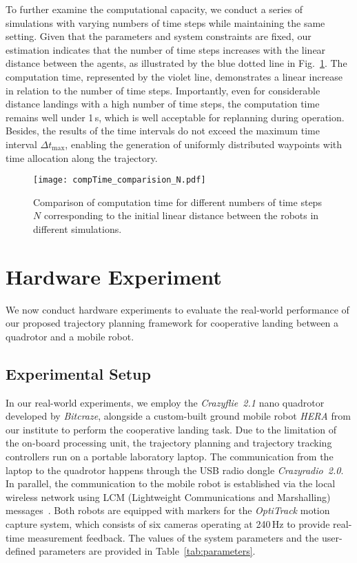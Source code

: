 \documentclass[conference,preprint]{IEEEtran}
\begin{document}
To further examine the computational capacity, we conduct a series of simulations with varying numbers of time steps while maintaining the same setting. Given that the parameters and system constraints are fixed, our estimation indicates that the number of time steps increases with the linear distance between the agents, as illustrated by the blue dotted line in Fig.~\ref{fig:compTime_comparision_N}. The computation time, represented by the violet line, demonstrates a linear increase in relation to the number of time steps. Importantly, even for considerable distance landings with a high number of time steps, the computation time remains well under 1\,s, which is well acceptable for replanning during operation. Besides, the results of the time intervals do not exceed the maximum time interval $\Delta t_\text{max}$, enabling the generation of uniformly distributed waypoints with time allocation along the trajectory.

\begin{figure}[thpb]
  \centering
  \texttt{[image: compTime\_comparision\_N.pdf]}
  \caption{Comparison of computation time for different numbers of time steps $N$ corresponding to the initial linear distance between the robots in different simulations.} 
  \label{fig:compTime_comparision_N}
\end{figure}    

\section{Hardware Experiment}
\label{sec:hardware_experiment}

We now conduct hardware experiments to evaluate the real-world performance of our proposed trajectory planning framework for cooperative landing between a quadrotor and a mobile robot.

\subsection{Experimental Setup}
In our real-world experiments, we employ the \textit{Crazyflie~2.1} nano quadrotor developed by \textit{Bitcraze}, alongside a custom-built ground mobile robot \textit{HERA} from our institute to perform the cooperative landing task. Due to the limitation of the on-board processing unit, the trajectory planning and trajectory tracking controllers run on a portable laboratory laptop. The communication from the laptop to the quadrotor happens through the USB radio dongle \textit{Crazyradio~2.0}. In parallel, the communication to the mobile robot is established via the local wireless network using LCM (Lightweight Communications and Marshalling) messages~\cite{Huang2010}. 
Both robots are equipped with markers for the \textit{OptiTrack} motion capture system, which consists of six cameras operating at 240\,Hz to provide real-time measurement feedback. 
The values of the system parameters and the user-defined parameters are provided in Table~\ref{tab:parameters}.
\end{document}
